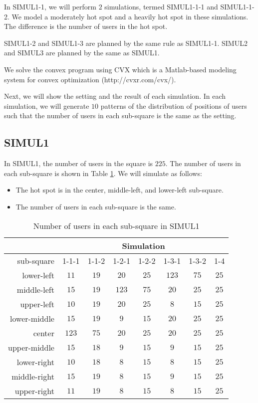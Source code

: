 	In SIMUL1-1, we will perform $2$ simulations, termed SIMUL1-1-1 and SIMUL1-1-2. We model a moderately hot spot and a heavily hot spot in these simulations. The difference is the number of users in the hot spot.

	SIMUL1-2 and SIMUL1-3 are planned by the same rule as SIMUL1-1. SIMUL2 and SIMUL3 are planned by the same as SIMUL1.

	We solve the convex program using CVX which is a Matlab-based modeling system for convex optimization (http://cvxr.com/cvx/).

	Next, we will show the setting and the result of each simulation. In each simulation, we will generate $10$ patterns of the distribution of positions of users such that the number of users in each sub-square is the same as the setting.

\subsection{SIMUL1}
	In SIMUL1, the number of users in the square is $225$. The number of users in each sub-square is shown in Table \ref{Tab:nouies1}. We will simulate as follows: 
	\begin{itemize}
		\item The hot spot is in the center, middle-left, and lower-left sub-square.
		\item The number of users in each sub-square is the same.
	\end{itemize}

	\begin{table} \small
		\centering \caption{Number of users in each sub-square in SIMUL1}
		\renewcommand\arraystretch{1.0}
		\begin{tabular}{|r||c||c||c||c||c||c||c|} %
			\hline
			&\multicolumn{7}{|c|}{Simulation} \\
			\hline	sub-square & 1-1-1 & 1-1-2 & 1-2-1 & 1-2-2 & 1-3-1 & 1-3-2 & 1-4 \\
			\hline
			\hline	lower-left & $11$ & $19$ & $20$ & $25$ & $123$ & $75$ & $25$ \\
			\hline	middle-left & $15$ & $19$ & $123$ & $75$ & $20$ & $25$ & $25$ \\
			\hline	upper-left & $10$ & $19$ & $20$ & $25$ & $8$ & $15$ & $25$ \\
			\hline	lower-middle & $15$ & $19$ & $9$ & $15$ & $20$ & $25$ & $25$ \\
			\hline	center & $123$ & $75$ & $20$ & $25$ & $20$ & $25$ & $25$ \\
			\hline	upper-middle & $15$ & $18$ & $9$ & $15$ & $9$ & $15$ & $25$ \\
			\hline	lower-right & $10$ & $18$ & $8$ & $15$ & $8$ & $15$ & $25$ \\
			\hline	middle-right & $15$ & $19$ & $8$ & $15$ & $9$ & $15$ & $25$ \\
			\hline	upper-right & $11$ & $19$ & $8$ & $15$ & $8$ & $15$ & $25$ \\
			\hline
		\end{tabular}\label{Tab:nouies1}
	\end{table}
	
